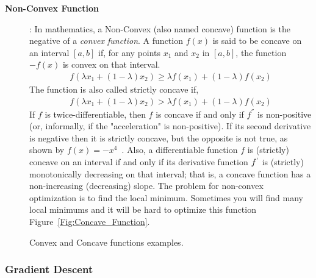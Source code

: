 \begin{description}
\item [\textbf{Non-Convex Function}]: In mathematics, a Non-Convex (also named concave) function is the negative of a \textit{convex function}. A function $f(x)$ is said to be concave on an interval $[a,b]$ if, for any points $x_1$ and $x_2$ in $[a,b]$, the function $-f(x)$ is convex on that interval.%
\begin{equation}\label{eq:concave_fun}
 \begin{split}
f(\lambda x_1 + (1-\lambda)x_2) \geq \lambda f(x_1) + (1 - \lambda) f(x_2)
 \end{split}
\end{equation}%
The function is also called strictly concave if,
\begin{equation}\label{eq:concave_fun_strictly}
 \begin{split}
f(\lambda x_1 + (1-\lambda)x_2) > \lambda f(x_1) + (1 - \lambda) f(x_2)
 \end{split}
\end{equation}%
%
If $f$ is twice-differentiable, then $f$ is concave if and only if $f^{''}$ is non-positive (or, informally, if the "acceleration" is non-positive). If its second derivative is negative then it is strictly concave, but the opposite is not true, as shown by $f(x) = −x^4$~\cite{Wiki_Concave_Function}. Also, a differentiable function $f$ is (strictly) concave on an interval if and only if its derivative function $f^`$ is (strictly) monotonically decreasing on that interval; that is, a concave function has a non-increasing (decreasing) slope. The problem for non-convex optimization is to find the local minimum. Sometimes you will find many local minimums and it will be hard to optimize this function Figure~\ref{Fig:Concave_Function}.%
\end{description}
%
\begin{figure}[t]
 \centering
\caption{Convex and Concave functions examples.}
\end{figure}%
\subsubsection{Gradient Descent}

